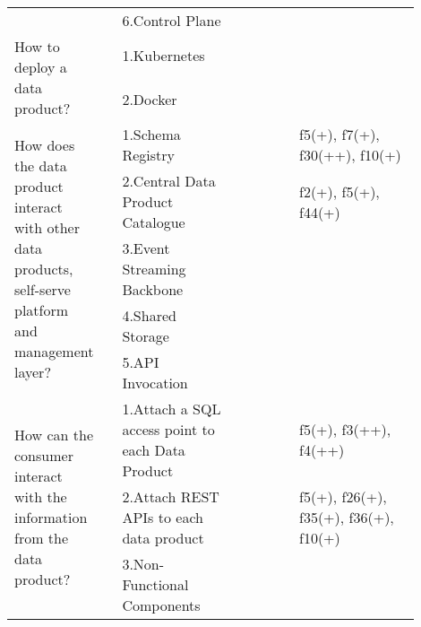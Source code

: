 \begin{tabular}{|p{0.12\linewidth}|p{0.015\linewidth}|p{0.3\linewidth}|p{0.15\linewidth}|p{0.31\linewidth}|}
 & \multirow{-6}{\linewidth}{ \cellcolor{emerald_shape_6}{37}} &6.Control Plane&\cellcolor{emerald_shape_2}{s49, s52} & \\
\multirow{2}{\linewidth}{How to deploy a data product?} &\cellcolor{emerald_shape_3}{} &1.Kubernetes&\cellcolor{emerald_shape_7}{s6, s14, s32, s35, s39, s43, s45, s47} & \\
 & \multirow{-2}{\linewidth}{ \cellcolor{emerald_shape_3}{11}} &2.Docker&\cellcolor{emerald_shape_6}{s14, s15, s30, s32, s33, s45, s47} & \\
\multirow{5}{\linewidth}{How does the data product interact with other data products, self-serve platform and management layer?} &\cellcolor{emerald_shape_6}{} &1.Schema Registry&\cellcolor{emerald_shape_5}{s3, s6, s7, s15, s16, s17, s19, s20, s24, s41, s47, s48, s54, s57} & f5(+), f7(+), f30(++), f10(+)\\
 & \cellcolor{emerald_shape_6}{} & 2.Central Data Product Catalogue&\cellcolor{emerald_shape_5}{s5, s9, s15, s20, s23, s31, s32, s39, s40, s42, s45, s46, s47, s48, s49, s53, s54, s55} & f2(+), f5(+), f44(+)\\
 & \cellcolor{emerald_shape_6}{} & 3.Event Streaming Backbone&\cellcolor{emerald_shape_6}{s4, s9, s17, s20, s26, s33, s34, s36, s38, s41, s44, s45, s48, s51, s52, s53, s55, s56, s57} & \\
 & \cellcolor{emerald_shape_6}{} & 4.Shared Storage&\cellcolor{emerald_shape_1}{} & \\
 & \multirow{-5}{\linewidth}{ \cellcolor{emerald_shape_6}{37}} &5.API Invocation&\cellcolor{emerald_shape_1}{} & \\
\multirow{3}{\linewidth}{How can the consumer interact with the information from the data product?} &\cellcolor{emerald_shape_6}{} &1.Attach a SQL access point to each Data Product&\cellcolor{emerald_shape_6}{s2, s3, s5, s7, s10, s13, s14, s15, s16, s27, s30, s31, s32, s36, s37, s38, s39, s43, s46, s48, s49} & f5(+), f3(++), f4(++)\\
 & \cellcolor{emerald_shape_6}{} & 2.Attach REST APIs to each data product&\cellcolor{emerald_shape_6}{s2, s3, s5, s6, s7, s8, s9, s15, s17, s18, s20, s30, s32, s33, s34, s36, s37, s38, s39, s40, s41, s45, s49, s52} & f5(+), f26(+), f35(+), f36(+), f10(+)\\
 & \multirow{-3}{\linewidth}{ \cellcolor{emerald_shape_6}{39}} &3.Non-Functional Components&\cellcolor{emerald_shape_6}{s1, s3, s4, s5, s6, s12, s15, s20, s23, s27, s31, s32, s36, s38, s39, s40, s43, s47, s52, s56} & \\
\hline

\end{tabular}
